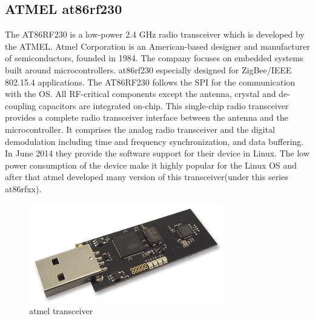 \subsection{ATMEL at86rf230}
The AT86RF230 is a low-power 2.4 GHz radio transceiver which is developed by the ATMEL. Atmel Corporation is an American-based designer and manufacturer of semiconductors, founded in 1984. The company focuses on embedded systems built around microcontrollers. at86rf230 especially designed for ZigBee/IEEE 802.15.4 applications. The AT86RF230 follows the SPI for the communication with the OS. All RF-critical components except the antenna, crystal and de-coupling capacitors are integrated on-chip. This single-chip radio transceiver provides a complete radio transceiver interface between the antenna and the microcontroller. It comprises the analog radio transceiver and the digital demodulation including time and frequency synchronization, and data buffering. In June 2014 they provide the software support for their device in Linux. The low power consumption of the device make it highly popular for the Linux OS and after that atmel developed many version of this transceiver(under this series at86rfxx).
\begin{figure}[ht]
	\centering
	\includegraphics[scale=0.8]{images/atmel.jpg}
	\caption{atmel transceiver}
\end{figure}
